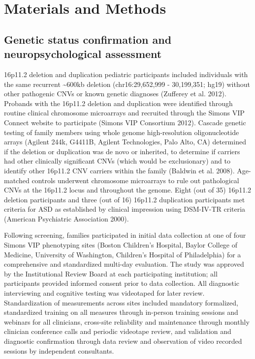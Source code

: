 \documentclass[]{article}
\begin{document}
\medskip

\section{Materials and Methods}\label{materials-and-methods}

\subsection{Genetic status confirmation and neuropsychological
assessment}\label{genetic-status-confirmation-and-neuropsychological-assessment}

16p11.2 deletion and duplication pediatric participants included
individuals with the same recurrent \textasciitilde{}600kb deletion
(chr16:29,652,999 - 30,199,351; hg19) without other pathogenic CNVs or
known genetic diagnoses (Zufferey et al. 2012). Probands with the
16p11.2 deletion and duplication were identified through routine
clinical chromosome microarrays and recruited through the Simons VIP
Connect website to participate (Simons VIP Consortium 2012). Cascade
genetic testing of family members using whole genome high-resolution
oligonucleotide arrays (Agilent 244k, G4411B, Agilent Technologies, Palo
Alto, CA) determined if the deletion or duplication was de novo or
inherited, to determine if carriers had other clinically significant
CNVs (which would be exclusionary) and to identify other 16p11.2 CNV
carriers within the family (Baldwin et al. 2008). Age-matched controls
underwent chromosome microarrays to rule out pathological CNVs at the
16p11.2 locus and throughout the genome. Eight (out of 35) 16p11.2
deletion participants and three (out of 16) 16p11.2 duplication
participants met criteria for ASD as established by clinical impression
using DSM-IV-TR criteria (American Psychiatric Association 2000).

\medskip

Following screening, families participated in initial data collection at
one of four Simons VIP phenotyping sites (Boston Children's Hospital,
Baylor College of Medicine, University of Washington, Children's
Hospital of Philadelphia) for a comprehensive and standardized multi-day
evaluation. The study was approved by the Institutional Review Board at
each participating institution; all participants provided informed
consent prior to data collection. All diagnostic interviewing and
cognitive testing was videotaped for later review. Standardization of
measurements across sites included mandatory formalized, standardized
training on all measures through in-person training sessions and
webinars for all clinicians, cross-site reliability and maintenance
through monthly clinician conference calls and periodic videotape
review, and validation and diagnostic confirmation through data review
and observation of video recorded sessions by independent consultants.
\end{document}

